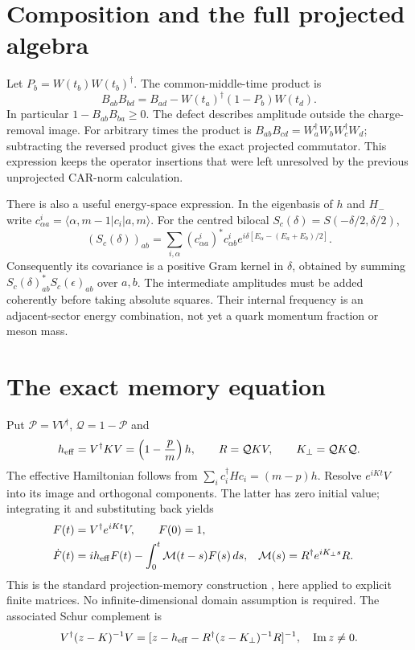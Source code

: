 \documentclass[11pt,a4paper]{article}
\newcommand{\Qc}{\mathcal Q}
\newcommand{\Pc}{\mathcal P}
\begin{document}
\section{Composition and the full projected algebra}
Let $P_b=W(t_b)W(t_b)^\dagger$. The common-middle-time product is
\begin{equation}\label{eq:composition}
 B_{ab}B_{bd}=B_{ad}-W(t_a)^\dagger(1-P_b)W(t_d).
\end{equation}
In particular $1-B_{ab}B_{ba}\geq0$. The defect describes amplitude
outside the charge-removal image. For arbitrary times the product is
$B_{ab}B_{cd}=W_a^\dagger W_bW_c^\dagger W_d$; subtracting the
reversed product gives the exact projected commutator. This expression
keeps the operator insertions that were left unresolved by the previous
unprojected CAR-norm calculation.

There is also a useful energy-space expression. In the eigenbasis of
$h$ and $H_-$ write $c^i_{\alpha a}=\langle\alpha,m-1|c_i|a,m\rangle$.
For the centred bilocal $S_c(\delta)=S(-\delta/2,\delta/2)$,
\begin{equation}\label{eq:spectral}
 (S_c(\delta))_{ab}
 =\sum_{i,\alpha}(c^i_{\alpha a})^*c^i_{\alpha b}
 e^{i\delta[E_\alpha-(E_a+E_b)/2]}.
\end{equation}
Consequently its covariance is a positive Gram kernel in $\delta$,
obtained by summing $S_c(\delta)_{ab}^*S_c(\epsilon)_{ab}$ over $a,b$.
The intermediate amplitudes must be added coherently before taking
absolute squares. Their internal frequency is an adjacent-sector
energy combination, not yet a quark momentum fraction or meson mass.

\section{The exact memory equation}
Put $\Pc=VV^\dagger$, $\Qc=1-\Pc$ and
\begin{equation}
 h_{\rm eff}=V^\dagger KV=\left(1-\frac pm\right)h,
 \qquad R=\Qc KV,\qquad K_\perp=\Qc K\Qc.
\end{equation}
The effective Hamiltonian follows from
$\sum_i c_i^\dagger Hc_i=(m-p)h$. Resolve $e^{iKt}V$ into its
image and orthogonal components. The latter has zero initial value;
integrating it and substituting back yields
\begin{align}\label{eq:memory}
 F(t)&=V^\dagger e^{iKt}V,\qquad F(0)=1,\\
 \dot F(t)&=ih_{\rm eff}F(t)-\int_0^t\mathcal M(t-s)F(s)\,ds,
 &\mathcal M(s)&=R^\dagger e^{iK_\perp s}R.\nonumber
\end{align}
This is the standard projection-memory construction \cite{Mori},
here applied to explicit finite matrices. No infinite-dimensional
domain assumption is required. The associated Schur complement is
\begin{equation}
 V^\dagger(z-K)^{-1}V=
 [z-h_{\rm eff}-R^\dagger(z-K_\perp)^{-1}R]^{-1},
 \quad\operatorname{Im}z\ne0.
\end{equation}
\end{document}

